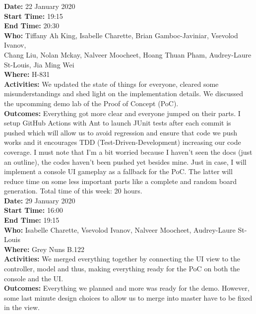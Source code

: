 \documentclass[12pt]{article}
\begin{document}
{\bf Date:} 22 January 2020\\
{\bf Start Time:} 19:15\\
{\bf End Time:} 20:30\\
{\bf Who:} Tiffany Ah King, Isabelle Charette, Brian Gamboc-Javiniar, Vsevolod Ivanov,\\
Chang Liu, Nolan Mckay, Nalveer Moocheet, Hoang Thuan Pham, Audrey-Laure St-Louis, Jia Ming Wei\\
{\bf Where:} H-831\\
{\bf Activities:} We updated the state of things for everyone, cleared some misunderstandings and shed light on the implementation details. We discussed the upcomming demo lab of the Proof of Concept (PoC).\\
{\bf Outcomes:} Everything got more clear and everyone jumped on their parts. I setup GitHub Actions with Ant to launch JUnit tests after each commit is pushed which will allow us to avoid regression and ensure that code we push works and it encourages TDD (Test-Driven-Development) increasing our code coverage. I must note that I'm a bit worried because I haven't seen the docs (just an outline), the codes haven't been pushed yet besides mine. Just in case, I will implement a console UI gameplay as a fallback for the PoC. The latter will reduce time on some less important parts like a complete and random board generation. Total time of this week: 20 hours.\\

{\bf Date:} 29 January 2020\\
{\bf Start Time:} 16:00\\
{\bf End Time:} 19:15\\
{\bf Who:} Isabelle Charette, Vsevolod Ivanov, Nalveer Moocheet, Audrey-Laure St-Louis\\
{\bf Where:} Grey Nuns B.122\\
{\bf Activities:} We merged everything together by connecting the UI view to the controller, model and thus, making everything ready for the PoC on both the console and the UI.\\
{\bf Outcomes:} Everything we planned and more was ready for the demo. However, some last minute design choices to allow us to merge into master have to be fixed in the view.\\
\end{document}
